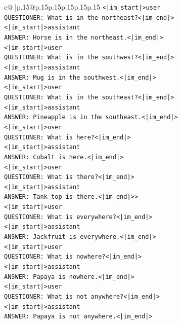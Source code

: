 \documentclass{article}
\begin{document}
{\begin{supertabular}{c@{$\;$}|p{.15\linewidth}@{}p{.15\linewidth}p{.15\linewidth}p{.15\linewidth}p{.15\linewidth}p{.15\linewidth}}
{{{\texttt{<|im\_start|>user} \\
\texttt{QUESTIONER: What is in the northeast?<|im\_end|>} \\
\texttt{<|im\_start|>assistant} \\
\texttt{ANSWER: Horse is in the northeast.<|im\_end|>} \\
\texttt{<|im\_start|>user} \\
\texttt{QUESTIONER: What is in the southwest?<|im\_end|>} \\
\texttt{<|im\_start|>assistant} \\
\texttt{ANSWER: Mug is in the southwest.<|im\_end|>} \\
\texttt{<|im\_start|>user} \\
\texttt{QUESTIONER: What is in the southeast?<|im\_end|>} \\
\texttt{<|im\_start|>assistant} \\
\texttt{ANSWER: Pineapple is in the southeast.<|im\_end|>} \\
\texttt{<|im\_start|>user} \\
\texttt{QUESTIONER: What is here?<|im\_end|>} \\
\texttt{<|im\_start|>assistant} \\
\texttt{ANSWER: Cobalt is here.<|im\_end|>} \\
\texttt{<|im\_start|>user} \\
\texttt{QUESTIONER: What is there?<|im\_end|>} \\
\texttt{<|im\_start|>assistant} \\
\texttt{ANSWER: Tank top is there.<|im\_end|>>} \\
\texttt{<|im\_start|>user} \\
\texttt{QUESTIONER: What is everywhere?<|im\_end|>} \\
\texttt{<|im\_start|>assistant} \\
\texttt{ANSWER: Jackfruit is everywhere.<|im\_end|>} \\
\texttt{<|im\_start|>user} \\
\texttt{QUESTIONER: What is nowhere?<|im\_end|>} \\
\texttt{<|im\_start|>assistant} \\
\texttt{ANSWER: Papaya is nowhere.<|im\_end|>} \\
\texttt{<|im\_start|>user} \\
\texttt{QUESTIONER: What is not anywhere?<|im\_end|>} \\
\texttt{<|im\_start|>assistant} \\
\texttt{ANSWER: Papaya is not anywhere.<|im\_end|>} \\
}}}
\end{supertabular}}
\end{document}
